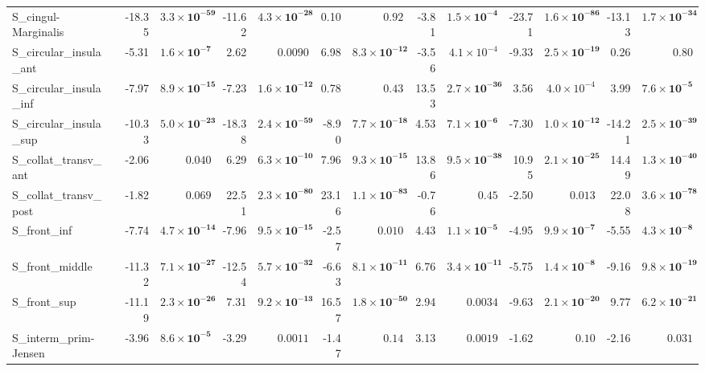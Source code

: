 {\begin{longtable}{llrrrrrrrrrrrr}
S\_cingul-Marginalis &  & -18.35 & $\mathbf{3.3{\times}10^{-59}}$ & -11.62 & $\mathbf{4.3{\times}10^{-28}}$ & 0.10 & $0.92$ & -3.81 & $\mathbf{1.5{\times}10^{-4}}$ & -23.71 & $\mathbf{1.6{\times}10^{-86}}$ & -13.13 & $\mathbf{1.7{\times}10^{-34}}$ \\
S\_circular\_insula\_ant &  & -5.31 & $\mathbf{1.6{\times}10^{-7}}$ & 2.62 & $0.0090$ & 6.98 & $\mathbf{8.3{\times}10^{-12}}$ & -3.56 & $4.1{\times}10^{-4}$ & -9.33 & $\mathbf{2.5{\times}10^{-19}}$ & 0.26 & $0.80$ \\
S\_circular\_insula\_inf &  & -7.97 & $\mathbf{8.9{\times}10^{-15}}$ & -7.23 & $\mathbf{1.6{\times}10^{-12}}$ & 0.78 & $0.43$ & 13.53 & $\mathbf{2.7{\times}10^{-36}}$ & 3.56 & $4.0{\times}10^{-4}$ & 3.99 & $\mathbf{7.6{\times}10^{-5}}$ \\
S\_circular\_insula\_sup &  & -10.33 & $\mathbf{5.0{\times}10^{-23}}$ & -18.38 & $\mathbf{2.4{\times}10^{-59}}$ & -8.90 & $\mathbf{7.7{\times}10^{-18}}$ & 4.53 & $\mathbf{7.1{\times}10^{-6}}$ & -7.30 & $\mathbf{1.0{\times}10^{-12}}$ & -14.21 & $\mathbf{2.5{\times}10^{-39}}$ \\
S\_collat\_transv\_ant &  & -2.06 & $0.040$ & 6.29 & $\mathbf{6.3{\times}10^{-10}}$ & 7.96 & $\mathbf{9.3{\times}10^{-15}}$ & 13.86 & $\mathbf{9.5{\times}10^{-38}}$ & 10.95 & $\mathbf{2.1{\times}10^{-25}}$ & 14.49 & $\mathbf{1.3{\times}10^{-40}}$ \\
S\_collat\_transv\_post &  & -1.82 & $0.069$ & 22.51 & $\mathbf{2.3{\times}10^{-80}}$ & 23.16 & $\mathbf{1.1{\times}10^{-83}}$ & -0.76 & $0.45$ & -2.50 & $0.013$ & 22.08 & $\mathbf{3.6{\times}10^{-78}}$ \\
S\_front\_inf &  & -7.74 & $\mathbf{4.7{\times}10^{-14}}$ & -7.96 & $\mathbf{9.5{\times}10^{-15}}$ & -2.57 & $0.010$ & 4.43 & $\mathbf{1.1{\times}10^{-5}}$ & -4.95 & $\mathbf{9.9{\times}10^{-7}}$ & -5.55 & $\mathbf{4.3{\times}10^{-8}}$ \\
S\_front\_middle &  & -11.32 & $\mathbf{7.1{\times}10^{-27}}$ & -12.54 & $\mathbf{5.7{\times}10^{-32}}$ & -6.63 & $\mathbf{8.1{\times}10^{-11}}$ & 6.76 & $\mathbf{3.4{\times}10^{-11}}$ & -5.75 & $\mathbf{1.4{\times}10^{-8}}$ & -9.16 & $\mathbf{9.8{\times}10^{-19}}$ \\
S\_front\_sup &  & -11.19 & $\mathbf{2.3{\times}10^{-26}}$ & 7.31 & $\mathbf{9.2{\times}10^{-13}}$ & 16.57 & $\mathbf{1.8{\times}10^{-50}}$ & 2.94 & $0.0034$ & -9.63 & $\mathbf{2.1{\times}10^{-20}}$ & 9.77 & $\mathbf{6.2{\times}10^{-21}}$ \\
S\_interm\_prim-Jensen &  & -3.96 & $\mathbf{8.6{\times}10^{-5}}$ & -3.29 & $0.0011$ & -1.47 & $0.14$ & 3.13 & $0.0019$ & -1.62 & $0.10$ & -2.16 & $0.031$ \\

\end{longtable}}
